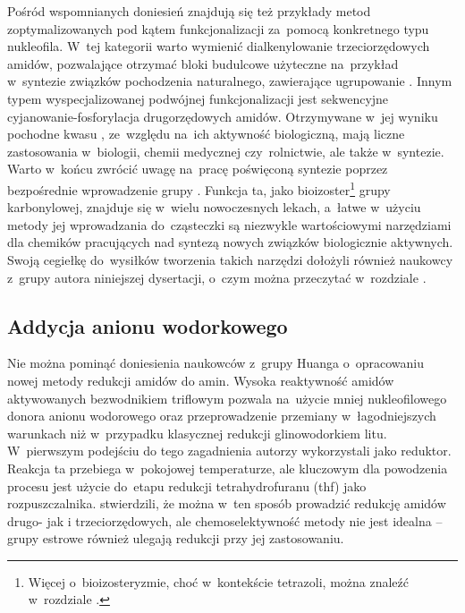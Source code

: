 Pośród wspomnianych doniesień znajdują się też przykłady metod zoptymalizowanych pod kątem
  funkcjonalizacji za~pomocą konkretnego typu nukleofila.
W~tej kategorii warto wymienić dialkenylowanie trzeciorzędowych amidów,
  pozwalające otrzymać bloki budulcowe użyteczne na~przykład w~syntezie związków pochodzenia naturalnego,
  zawierające ugrupowanie .
Innym typem wyspecjalizowanej podwójnej funkcjonalizacji jest sekwencyjne cyjanowanie-fosforylacja
  drugorzędowych amidów.
Otrzymywane w~jej wyniku pochodne kwasu , ze~względu na~ich aktywność biologiczną,
  mają liczne zastosowania w~biologii, chemii medycznej czy~rolnictwie, ale także w~syntezie.
Warto w~końcu zwrócić uwagę na~pracę poświęconą syntezie 
  poprzez bezpośrednie wprowadzenie grupy .
Funkcja ta, jako bioizoster\footnote{%
    Więcej o~bioizosteryzmie, choć w~kontekście tetrazoli, można znaleźć w~rozdziale .%
  } grupy karbonylowej, znajduje się w~wielu nowoczesnych lekach,
  a~łatwe w~użyciu metody jej wprowadzania do~cząsteczki są niezwykle wartościowymi narzędziami
  dla chemików pracujących nad syntezą nowych związków biologicznie aktywnych.
Swoją cegiełkę do~wysiłków tworzenia takich narzędzi dołożyli również naukowcy z~grupy autora niniejszej dysertacji,
  o~czym można przeczytać w~rozdziale .

\subsection{Addycja anionu wodorkowego}\label{literature:triflic:reduction}
Nie można pominąć doniesienia naukowców z~grupy Huanga o~opracowaniu nowej metody redukcji amidów do amin.
Wysoka reaktywność amidów aktywowanych bezwodnikiem triflowym pozwala na~użycie mniej nukleofilowego donora anionu wodorowego oraz
przeprowadzenie przemiany w~łagodniejszych warunkach niż w~przypadku klasycznej redukcji glinowodorkiem litu.
W~pierwszym podejściu do tego zagadnienia autorzy wykorzystali  jako reduktor.
Reakcja ta przebiega w~pokojowej temperaturze, ale
  kluczowym dla powodzenia procesu jest użycie do~etapu redukcji tetrahydrofuranu (\acrshort{thf}) jako rozpuszczalnika.
\citeauthor{xiang10} stwierdzili, że można w~ten sposób prowadzić redukcję amidów drugo- jak i trzeciorzędowych,
  ale chemoselektywność metody nie jest idealna \--- grupy estrowe również ulegają redukcji
  przy jej zastosowaniu.

